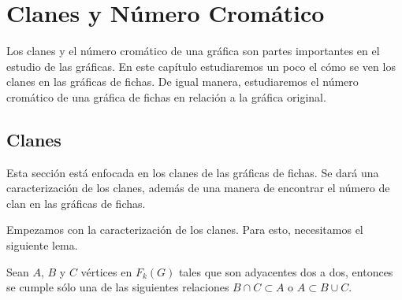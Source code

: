 \chapter{Clanes y N\'umero Crom\'atico}%
\label{cap:Clique-ChromNum}
Los clanes y el n\'umero crom\'atico de una gr\'afica son partes importantes en
el estudio de las gr\'aficas. En este cap\'itulo estudiaremos un poco el c\'omo
se ven los clanes en las gr\'aficas de fichas. De igual manera, estudiaremos el
n\'umero crom\'atico de una gr\'afica de fichas en relaci\'on a la gr\'afica
original.

\section{Clanes}%
\label{sec:clanes}

Esta secci\'on est\'a enfocada en los clanes de las gr\'aficas de fichas.
Se dar\'a una caracterizaci\'on de los clanes, adem\'as de una manera de
encontrar el n\'umero de clan en las gr\'aficas de fichas.


Empezamos con la caracterizaci\'on de los clanes. Para esto,
necesitamos el siguiente lema. 

\begin{lema}%
\label{lem:K3}
    Sean $A$, $B$ y $C$ v\'ertices en $F_k(G)$ tales que son adyacentes dos a
    dos, entonces se cumple s\'olo una de las siguientes relaciones $B \cap C
    \subset A$ o $A \subset B \cup C$.
\end{lema}

